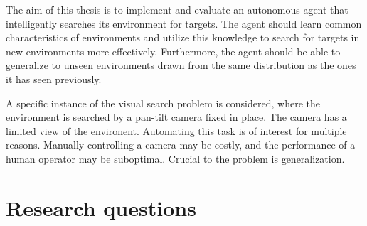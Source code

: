 The aim of this thesis is to implement and evaluate an autonomous agent that intelligently searches its environment for targets.
The agent should learn common characteristics of environments and utilize this knowledge to search for targets in new environments more effectively.
Furthermore, the agent should be able to generalize to unseen environments drawn from the same distribution as the ones it has seen previously.

A specific instance of the visual search problem is considered, where the environment is searched by a pan-tilt camera fixed in place.
The camera has a limited view of the environent.
Automating this task is of interest for multiple reasons.
Manually controlling a camera may be costly, and the performance of a human operator may be suboptimal.
Crucial to the problem is generalization.

% 

\section{Research questions}
\label{sec:research-questions}

% 
% 
% 
% 
% 
% 
% 
% 

